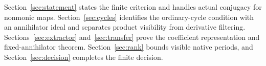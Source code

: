 Section~\ref{sec:statement} states the finite criterion and handles
actual conjugacy for nonmonic maps. Section~\ref{sec:cycles}
identifies the ordinary-cycle condition with an annihilator ideal
and separates product visibility from derivative filtering.
Sections~\ref{sec:extractor} and~\ref{sec:transfer} prove the
coefficient representation and fixed-annihilator theorem.
Section~\ref{sec:rank} bounds visible native periods, and
Section~\ref{sec:decision} completes the finite decision.

